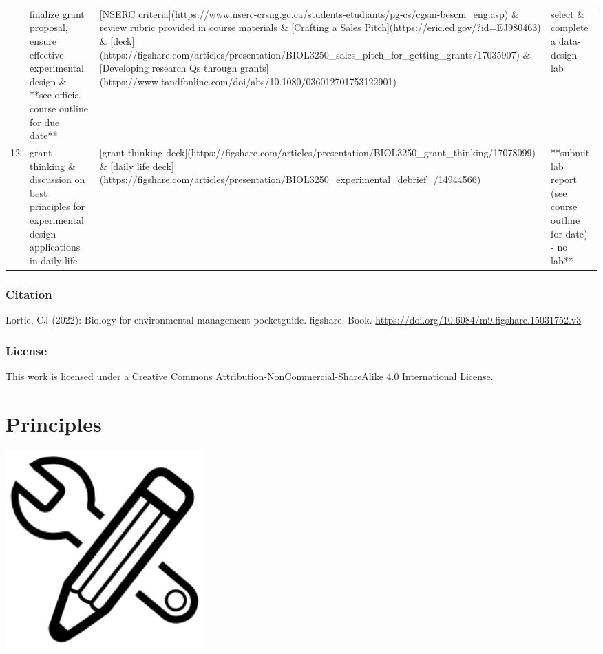 \documentclass[
]{book}
\begin{document}
\begin{tabular}{rlll}
\addlinespace
11 & finalize grant proposal, ensure effective experimental design \& **see official course outline for due date** & {}[NSERC criteria](https://www.nserc-crsng.gc.ca/students-etudiants/pg-cs/cgsm-bescm\_eng.asp) \& review rubric provided in course materials \& [Crafting a Sales Pitch](https://eric.ed.gov/?id=EJ980463) \& [deck](https://figshare.com/articles/presentation/BIOL3250\_sales\_pitch\_for\_getting\_grants/17035907) \& [Developing research Qs through grants](https://www.tandfonline.com/doi/abs/10.1080/036012701753122901) & select \& complete a data-design lab\\
12 & grant thinking \& discussion on best principles for experimental design applications in daily life & {}[grant thinking deck](https://figshare.com/articles/presentation/BIOL3250\_grant\_thinking/17078099) \& [daily life deck](https://figshare.com/articles/presentation/BIOL3250\_experimental\_debrief\_/14944566) & **submit lab report (see course outline for date) - no lab**\\
\bottomrule
\end{tabular}

\hypertarget{citation}{%
\subsection*{Citation}\label{citation}}

Lortie, CJ (2022): Biology for environmental management pocketguide. figshare. Book. \url{https://doi.org/10.6084/m9.figshare.15031752.v3}

\hypertarget{license}{%
\subsection*{License}\label{license}}

This work is licensed under a Creative Commons Attribution-NonCommercial-ShareAlike 4.0 International License.

\hypertarget{principles}{%
\chapter{Principles}\label{principles}}

\includegraphics[width=3in,height=\textheight]{./design.png}
\end{document}
